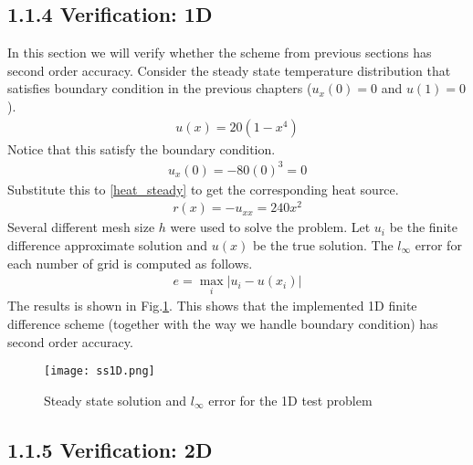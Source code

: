 \documentclass[11pt, letterpaper, hidelinks]{article}
\theoremstyle{definition}
\newcommand{\abs}[1]{\left\lvert#1\right\rvert}
\begin{document}
\subsection{1.1.4 Verification: 1D}
In this section we will verify whether the scheme from previous sections has second order accuracy. Consider the steady state temperature distribution that satisfies boundary condition in the previous chapters ($u_x(0)=0$ and $u(1)=0$).
\begin{align*}
    u(x) = 20(1-x^4)
\end{align*}
Notice that this satisfy the boundary condition.
\begin{align*}
    u_x(0) = -80(0)^3 = 0
\end{align*}
Substitute this to \eqref{heat_steady} to get the corresponding heat source.
\begin{align*}
    r(x) = -u_{xx} = 240x^2
\end{align*}
Several different mesh size $h$ were used to solve the problem. Let $u_i$ be the finite difference approximate solution and $u(x)$ be the true solution. The $l_{\infty}$ error for each number of grid is computed as follows.
\begin{align*}
    e = \max_i \abs{u_i - u(x_i)}
\end{align*}
The results is shown in Fig.\ref{fig:ss1D}. This shows that the implemented 1D finite difference scheme (together with the way we handle boundary condition) has second order accuracy.
\begin{figure}[H]
    \texttt{[image: ss1D.png]}
    \centering
    \caption{Steady state solution and $l_\infty$ error for the 1D test problem}
    \label{fig:ss1D}
\end{figure}

\subsection{1.1.5 Verification: 2D}
\end{document}
